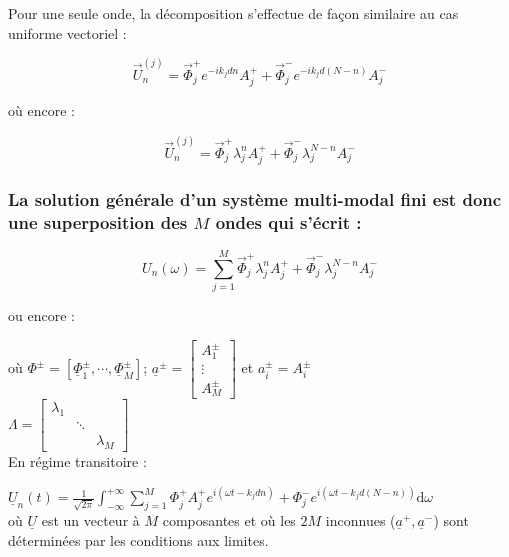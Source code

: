 \documentclass[12pt,a4paper]{article}
\begin{document}
Pour une seule onde, la décomposition s'effectue de façon similaire au cas uniforme vectoriel :

 \[\vec U_n^{(j)} = \vec\Phi_j^+ e^{-ik_j dn}A_j^+ + \vec\Phi_j^- e^{-ik_jd(N-n)} A_j^- \]
 
où encore :

\[\vec U_n^{(j)} = \vec\Phi_j^+ \lambda_j^n A_j^+ + \vec\Phi_j^-\lambda_j^{N-n}A_j^-\]
	
	\subsubsection{La solution générale d'un système multi-modal fini est donc une superposition des $M$ ondes qui s'écrit :}
	
	\[
	U_n(\omega) = \displaystyle\sum_{j=1}^M \vec\Phi_j^+ \lambda_j^nA_j^+ + \vec\Phi_j^-\lambda_j^{N-n}A_j^-
	\]
	
	ou encore : 
	
	\begin{center}
	\end{center}
	
	où $\Phi^\pm = \left[\underline{\Phi}_1^\pm,\cdots,\underline{\Phi}_M^\pm\right]$; $\underline{a}^\pm = \begin{bmatrix}
		A_1^\pm \\  \vdots \\ A_M^\pm
	\end{bmatrix}$ et $a_i^\pm = A_i^\pm$\\
	
	$\Lambda = \begin{bmatrix}
		\lambda_1 \\
		& \ddots \\
		&&\lambda_M
	\end{bmatrix}$\\
	
	En régime transitoire :
	
	$\underline{U}_n(t) = \frac1{\sqrt{2\pi}}\displaystyle\int_{-\infty}^{+\infty} \sum_{j=1}^M \Phi_j^+A_j^+e^{i(\omega t - k_j dn)} + \Phi_j^- e^{i(\omega t -k_jd(N-n))}\mathrm d\omega$\\
	
	où $\underline{U}$ est un vecteur à $M$ composantes et où les $2M$ inconnues ($\underline a^+,\underline a^-$) sont déterminées par les conditions aux limites.\\
	
\end{document}
